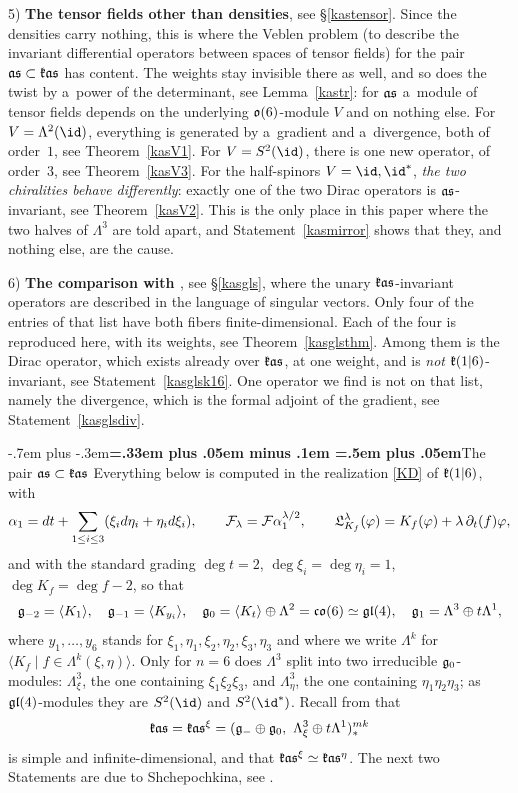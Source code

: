 \documentclass[12pt,a4paper]{amsart}
\makeatletter
\providecommand{\headspaces}{\spaceskip=.33em plus .05em minus .1em \xspaceskip=.5em plus .05em}
\def\subsection{\@startsection{subsection}{2}{0pt}{-1ex \@plus -.4ex \@minus -.2ex}%
  {-.7em plus -.3em}{\normalfont\normalsize\bfseries\boldmath\headspaces}}
\theoremstyle{thm}
\theoremstyle{definition}
\let\ssec\subsection
\makeatother
\begin{document}
5) \textbf{The tensor fields other than densities}, see \S\ref{kastensor}. Since the
densities carry nothing, this is where the Veblen problem \textup{(}to describe the invariant differential operators between spaces of tensor fields\textup{)} for the pair ${\mathfrak{as}}\subset{\mathfrak{k}}{\mathfrak{as}}$
has content. The weights stay invisible there as well, and so does the twist by a~power of the
determinant, see Lemma~\ref{kastr}: for ${\mathfrak{as}}$ a~module of tensor fields depends on the
underlying ${\mathfrak{o}}(6)$-module $V$ and on nothing else. For $V=\Lambda^2(\id)$, everything is
generated by a~gradient and a~divergence, both of order~$1$, see Theorem~\ref{kasV1}. For
$V=S^2(\id)$, there is one new operator, of order~$3$, see Theorem~\ref{kasV3}. For the
half-spinors $V=\id,\id^*$, \textit{the two chiralities behave differently}: exactly one of
the two Dirac operators is ${\mathfrak{as}}$-invariant, see Theorem~\ref{kasV2}. This is the only place
in this paper where the two halves of $\Lambda^3$ are told apart, and
Statement~\ref{kasmirror} shows that they, and nothing else, are the cause.

6) \textbf{The comparison with \cite[\S10]{GLS}}, see \S\ref{kasgls}, where the
unary ${\mathfrak{k}}{\mathfrak{as}}$-invariant operators are described in the language of singular vectors.
Only four of the entries of that list have both fibers finite-dimensional. Each of the
four is reproduced here, with its weights, see Theorem~\ref{kasglsthm}. Among them is the
Dirac operator, which exists already over ${\mathfrak{k}}{\mathfrak{as}}$, at one weight, and is \textit{not}
${\mathfrak{k}}(1|6)$-invariant, see Statement~\ref{kasglsk16}. One operator we find is not on that
list, namely the divergence, which is the formal adjoint of the gradient, see
Statement~\ref{kasglsdiv}.

\ssec{The pair ${\mathfrak{as}}\subset{\mathfrak{k}}{\mathfrak{as}}$}\label{kaspair}
Everything below is computed in the realization \eqref{KD} of ${\mathfrak{k}}(1|6)$, with
\[
\alpha_1=dt+\sum_{1\leq i\leq 3}(\xi_i d\eta_i+\eta_i d\xi_i),\qquad
{\mathcal F}_\lambda={\mathcal F}\alpha_1^{\lambda/2},\qquad
{\mathfrak{L}}^\lambda_{K_f}(\varphi)=K_f(\varphi)+\lambda\,\partial_t(f)\varphi,
\]
and with the standard grading $\deg t=2$, $\deg\xi_i=\deg\eta_i=1$, $\deg K_f=\deg f-2$, so
that
\[
{\mathfrak{g}}_{-2}=\langle K_1\rangle,\quad {\mathfrak{g}}_{-1}=\langle K_{y_i}\rangle,\quad
{\mathfrak{g}}_0=\langle K_t\rangle\oplus\Lambda^2={\mathfrak{c}}{\mathfrak{o}}(6)\simeq{\mathfrak{gl}}(4),\quad
{\mathfrak{g}}_1=\Lambda^3\oplus t\Lambda^1,
\]
where $y_1,\dots,y_6$ stands for $\xi_1,\eta_1,\xi_2,\eta_2,\xi_3,\eta_3$ and where we write
$\Lambda^k$ for $\langle K_f\mid f\in\Lambda^k(\xi,\eta)\rangle$. Only for $n=6$ does
$\Lambda^3$ split into two irreducible ${\mathfrak{g}}_0$-modules: $\Lambda^3_\xi$, the one containing
$\xi_1\xi_2\xi_3$, and $\Lambda^3_\eta$, the one containing $\eta_1\eta_2\eta_3$; as
${\mathfrak{gl}}(4)$-modules they are $S^2(\id)$ and $S^2(\id^*)$. Recall from \cite{Shex} that
\[
\fk\fas=\fk\fas^\xi=(\fg_-\oplus\fg_0,\ \Lambda^3_\xi\oplus t\Lambda^1)_*^{mk}
\]
is simple and infinite-dimensional, and that ${\mathfrak{k}}{\mathfrak{as}}^\xi\simeq{\mathfrak{k}}{\mathfrak{as}}^\eta$. The next two
Statements are due to Shchepochkina, see \cite{Sh5, Shex}.
\end{document}
